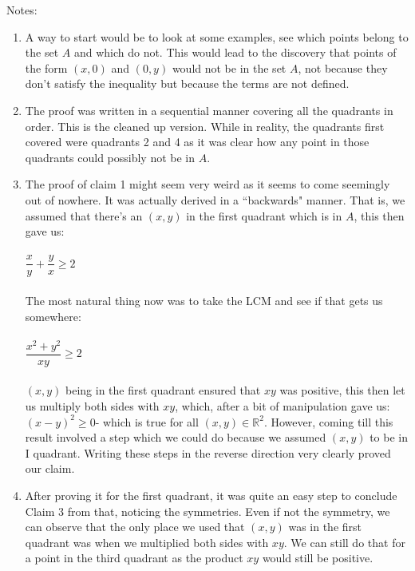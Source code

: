 Notes:
\begin{enumerate}
    \item A way to start would be to look at some examples, see which points belong to the set $A$ and which do not. This would lead to the discovery that points of the form $(x, 0)$ and $(0, y)$ would not be in the set $A$, not because they don't satisfy the inequality but because the terms are not defined.
    \item The proof was written in a sequential manner covering all the quadrants in order. This is the cleaned up version. While in reality, the quadrants first covered were quadrants 2 and 4 as it was clear how any point in those quadrants could possibly not be in $A$.
    \item The proof of claim 1 might seem very weird as it seems to come seemingly out of nowhere. It was actually derived in a ``backwards" manner. That is, we assumed that there's an $(x, y)$ in the first quadrant which is in $A$, this then gave us:\\~\\
    $\dfrac{x}{y} + \dfrac{y}{x} \ge 2$\\~\\
    The most natural thing now was to take the LCM and see if that gets us somewhere:\\~\\
    $\dfrac{x^2 + y^2}{xy} \ge 2$\\~\\
    $(x, y)$ being in the first quadrant ensured that $xy$ was positive, this then let us multiply both sides with $xy$, which, after a bit of manipulation gave us:\\
    $(x-y)^2 \ge 0$- which is true for all $(x, y) \in \mathbb{R}^2$. However, coming till this result involved a step which we could do because we assumed $(x, y)$ to be in I quadrant. Writing these steps in the reverse direction very clearly proved our claim.
    \item After proving it for the first quadrant, it was quite an easy step to conclude Claim 3 from that, noticing the symmetries. Even if not the symmetry, we can observe that the only place we used that $(x, y)$ was in the first quadrant was when we multiplied both sides with $xy$. We can still do that for a point in the third quadrant as the product $xy$ would still be positive.
\end{enumerate}

\hrulefill


